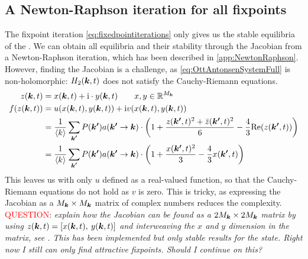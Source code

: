 \subsection{A Newton-Raphson iteration for all fixpoints}
The fixpoint iteration \eqref{eq:fixedpointiterations} only gives us the stable equilibria of the \MFR. We can obtain all equilibria and their stability through the Jacobian from a Newton-Raphson iteration, which has been described in \ref{app:NewtonRaphson}. However, finding the Jacobian is a challenge, as \eqref{eq:OttAntonsenSystemFull} is non-holomorphic: $H_2({\boldsymbol{k}},t)$ does not satisfy the Cauchy-Riemann equations.
\begin{align*}
z(\k,t) &= x(\k,t) + \ic \cdot y(\k,t) \qquad x, y \in \R^{M_{\k}}\\
f\left( z(\k,t) \right) &= u\left(x(\k, t), y(\k, t) \right) + \ic v\left(x(\k, t), y(\k, t) \right)\\
&= \frac{1}{\kmean} \sum_{\kacc} P\left(\kacc\right) a\left(\kacc \rightarrow \k\right) \cdot \left( 1 + \frac{z(\kacc, t)^2 + \bar{z}(\kacc, t)^2}{6} - \frac{4}{3} \Re(z(\kacc, t)) \right)\\
&= \frac{1}{\kmean} \sum_{\kacc} P\left(\kacc\right) a\left(\kacc \rightarrow \k\right) \cdot \left( 1 + \frac{x(\kacc, t)^2}{3} - \frac{4}{3} x(\kacc, t) \right)
\end{align*}
This leaves us with only $u$ defined as a real-valued function, so that the Cauchy-Riemann equations do not hold as $v$ is zero. This is tricky, as expressing the Jacobian as a $M_{{\boldsymbol{k}}} \times M_{{\boldsymbol{k}}}$ matrix of complex numbers reduces the complexity. \\

\textcolor{red}{QUESTION}: \textsl{explain how the Jacobian can be found as a $2 M_{{\boldsymbol{k}}} \times 2 M_{{\boldsymbol{k}}}$ matrix by using $z({\boldsymbol{k}},t) = [ x({\boldsymbol{k}},t), \: y({\boldsymbol{k}},t)]$ and interweaving the $x$ and $y$ dimension in the matrix, see \cite{Cross2018}. This has been implemented but only stable results for the \PSR state. Right now I still can only find attractive fixpoints. Should I continue on this?}

